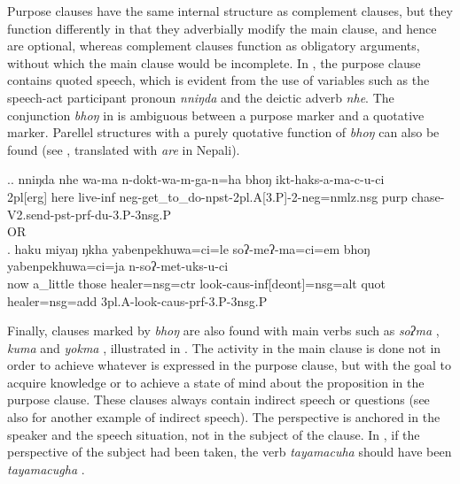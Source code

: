 Purpose clauses have the same internal structure as complement clauses, but they function differently in that they adverbially modify the main clause, and hence are optional, whereas complement clauses function as obligatory arguments, without which the main clause would be incomplete.
 In \Next[a], the purpose clause contains quoted speech, which is evident from the use of variables such as the speech-act participant pronoun \emph{nniŋda} and the deictic adverb \emph{nhe}. The conjunction \emph{bhoŋ} in \Next[a] is ambiguous between a purpose marker and a quotative marker. Parellel  structures with a purely quotative function of \emph{bhoŋ} can also be found (see \Next[b], translated with \emph{are} in Nepali). 

\ex.\ag. nniŋda nhe  wa-ma      n-dokt-wa-m-ga-n=ha  bhoŋ ikt-haks-a-ma-c-u-ci\\
	{\sc 2pl[erg]} here live{\sc -inf} {\sc neg-}get\_to\_do{\sc -npst-2pl.A[3.P]-2-neg=nmlz.nsg} {\sc purp} chase-{\sc V2.send-pst-prf-du-3.P-3nsg.P}	\\
	 OR \\
	 
	\bg. haku miyaŋ ŋkha yabenpekhuwa=ci=le   soʔ-meʔ-ma=ci=em    bhoŋ yabenpekhuwa=ci=ja    n-soʔ-met-uks-u-ci\\
	now a\_little those healer{\sc =nsg=ctr} look{\sc -caus-inf[deont]=nsg=alt} {\sc quot} healer{\sc =nsg=add} {\sc 3pl.A-}look{\sc -caus-prf-3.P-3nsg.P}\\
	 

	
Finally, clauses marked by \emph{bhoŋ} are also found with main verbs such as \emph{soʔma} , \emph{kuma}  and \emph{yokma} , illustrated in \Next. The activity in the main clause is done not in order to achieve whatever is expressed in the purpose clause, but with the goal to acquire knowledge or to achieve a state of mind about the proposition in the purpose clause.  These clauses always contain indirect speech or questions (see also \LLast[c] for another example of indirect speech). The perspective is anchored in the speaker and the speech situation, not in the subject of the clause. In \Next[a], if the perspective of the subject had been taken, the verb \emph{tayamacuha} should have been \emph{tayamacugha}  .

